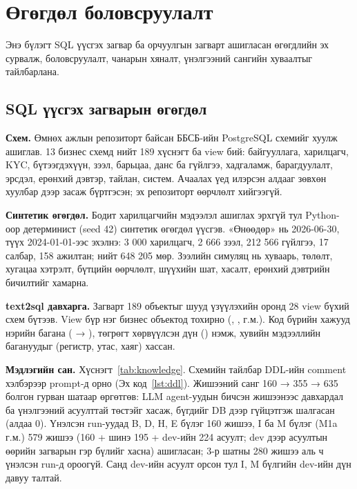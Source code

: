 
\chapter{Өгөгдөл боловсруулалт}
\label{ch:data}
\pagecolor{white}

Энэ бүлэгт SQL үүсгэх загвар ба орчуулгын загварт ашигласан өгөгдлийн эх сурвалж, боловсруулалт, чанарын хяналт, үнэлгээний
сангийн хуваалтыг тайлбарлана.

\section{SQL үүсгэх загварын өгөгдөл}
\label{sec:db}

\textbf{Схем.} Өмнөх ажлын репозиторт \cite{text2sql_thesis_2026} байсан ББСБ-ийн PostgreSQL схемийг хуулж ашиглав. 13
бизнес схемд нийт 189 хүснэгт ба view бий: байгууллага, харилцагч, KYC, бүтээгдэхүүн, зээл, барьцаа, данс ба гүйлгээ,
хадгаламж, барагдуулалт, эрсдэл, ерөнхий дэвтэр, тайлан, систем. Ачаалах үед илэрсэн алдааг зөвхөн хуулбар дээр засаж
бүртгэсэн; эх репозиторт өөрчлөлт хийгээгүй.

\textbf{Синтетик өгөгдөл.} Бодит харилцагчийн мэдээлэл ашиглах эрхгүй тул Python-оор детерминист (seed 42) синтетик
өгөгдөл үүсгэв. «Өнөөдөр» нь 2026-06-30, түүх 2024-01-01-ээс эхэлнэ: 3 000 харилцагч, 2 666 зээл, 212 566 гүйлгээ, 17
салбар, 158 ажилтан; нийт 648 205 мөр. Зээлийн симуляц нь хуваарь, төлөлт, хугацаа хэтрэлт, бүтцийн өөрчлөлт, шүүхийн
шат, хасалт, ерөнхий дэвтрийн бичилтийг хамарна.

\textbf{text2sql давхарга.} Загварт 189 объектыг шууд үзүүлэхийн оронд 28 view бүхий  схем бүтээв. View бүр нэг
бизнес объектод тохирно (, ,  г.м.). Код бүрийн хажууд нэрийн
багана ( → ), төгрөгт хөрвүүлсэн дүн () нэмж, хувийн мэдээллийн
багануудыг (регистр, утас, хаяг) хассан.

\textbf{Мэдлэгийн сан.} Хүснэгт~\ref{tab:knowledge}. Схемийн тайлбар DDL-ийн comment хэлбэрээр prompt-д орно (Эх
код~\ref{lst:ddl}). Жишээний санг 160 → 355 → 635 болгон гурван шатаар өргөтгөв: LLM agent-уудын бичсэн жишээнээс
давхардал ба үнэлгээний асуулттай төстэйг хасаж, бүгдийг DB дээр гүйцэтгэж шалгасан (алдаа 0). Үнэлсэн run-уудад B, D, H, E
бүлэг 160 жишээ, I ба M бүлэг (M1a г.м.) 579 жишээ (160 + шинэ 195 + dev-ийн 224 асуулт; dev дээр асуултын өөрийн
загварын гэр бүлийг хасна) ашигласан; 3-р шатны 280 жишээ аль ч үнэлсэн run-д ороогүй. Санд dev-ийн асуулт орсон тул I, M
бүлгийн dev-ийн дүн давуу талтай.

